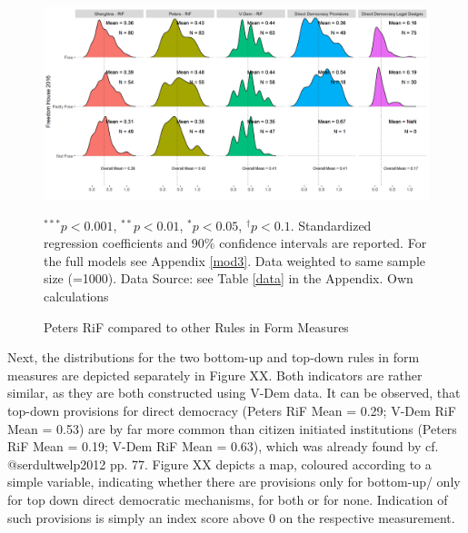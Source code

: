 \documentclass{systats}
\begin{document}
\begin{figure}
	\caption{Peters RiF compared to other Rules in Form Measures}
	\label{reg2}
	\includegraphics[width=\textwidth]{images/coef_rif2.png}
	\flushright
	{\scriptsize $^{***}p<0.001$, $^{**}p<0.01$, $^*p<0.05$, $^{\dagger}p<0.1$. Standardized regression coefficients and 90\% confidence intervals are reported. For the full models see Appendix \ref{mod3}. Data weighted to same sample size (=1000). Data Source: see Table \ref{data} in the Appendix. Own calculations  \par}
\end{figure}


Next, the distributions for the two bottom-up and top-down rules in form measures are depicted separately in Figure XX. Both indicators are rather similar, as they are both constructed using V-Dem data. It can be observed, that top-down provisions for direct democracy (Peters RiF Mean = 0.29; V-Dem RiF Mean = 0.53) are by far more common than citizen initiated institutions (Peters RiF Mean = 0.19; V-Dem RiF Mean = 0.63), which was already found by cf. @serdultwelp2012 pp. 77. Figure XX depicts a map, coloured according to a simple variable, indicating whether there are provisions only for bottom-up/ only for top down direct democratic mechanisms, for both or for none. Indication of such provisions is simply an index score above 0 on the respective measurement. 
\end{document}
